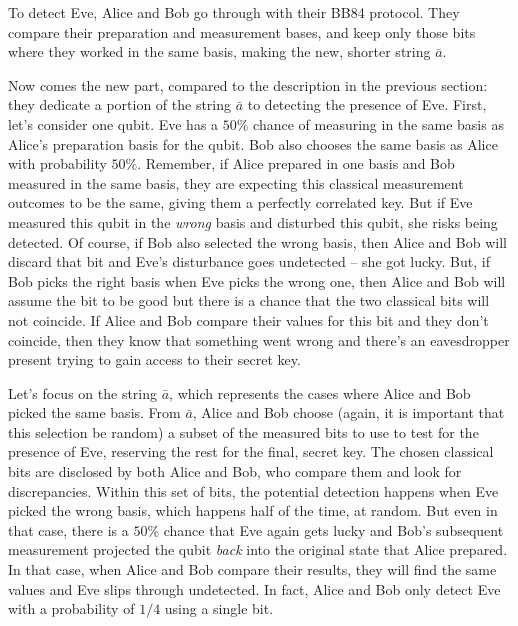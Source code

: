 To detect Eve, Alice and Bob go through with their BB84 protocol. They compare their preparation and measurement bases, and keep only those bits where they worked in the same basis, making the new, shorter string $\bar{a}$.

Now comes the new part, compared to the description in the previous section: they dedicate a portion of the string $\bar{a}$ to detecting the presence of Eve.  First, let's consider one qubit. Eve has a $50\%$ chance of measuring in the same basis as Alice's preparation basis for the qubit. Bob also chooses the same basis as Alice with probability $50\%$. Remember, if Alice prepared in one basis and Bob measured in the same basis, they are expecting this classical measurement outcomes to be the same, giving them a perfectly correlated key. But if Eve measured this qubit in the \emph{wrong} basis and disturbed this qubit, she risks being detected.  Of course, if Bob also selected the wrong basis, then Alice and Bob will discard that bit and Eve's disturbance goes undetected -- she got lucky.  But, if Bob picks the right basis when Eve picks the wrong one, then Alice and Bob will assume the bit to be good but there is a chance that the two classical bits will not coincide. If Alice and Bob compare their values for this bit and they don't coincide, then they know that something went wrong and there's an eavesdropper present trying to gain access to their secret key.  

Let's focus on the string $\bar{a}$, which represents the cases where Alice and Bob picked the same basis.
From $\bar{a}$, Alice and Bob choose (again, it is important that this selection be random) a subset of the measured bits to use to test for the presence of Eve, reserving the rest for the final, secret key.  The chosen classical bits are disclosed by both Alice and Bob, who compare them and look for discrepancies.  Within this set of bits, the potential detection happens when Eve picked the wrong basis, which happens half of the time, at random.  But even in that case, there is a $50\%$ chance that Eve again gets lucky and Bob's subsequent measurement projected the qubit \emph{back} into the original state that Alice prepared.  In that case, when Alice and Bob compare their results, they will find the same values and Eve slips through undetected.  In fact, Alice and Bob only detect Eve with a probability of $1/4$ using a single bit.

